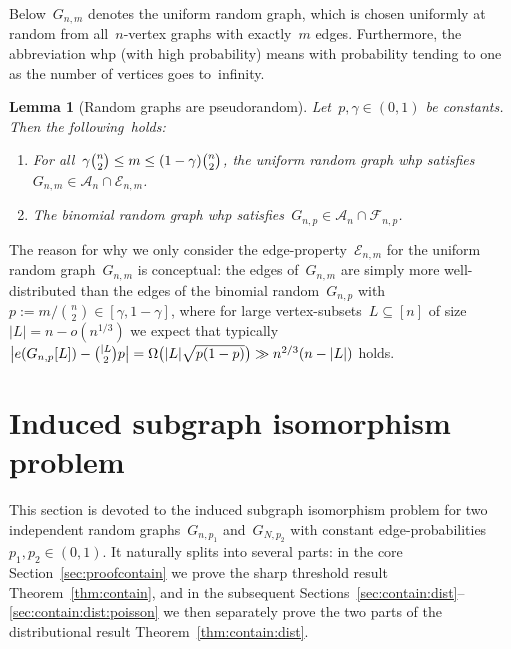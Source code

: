 \documentclass{article}
\newcommand{\cA}{\mathcal{A}}
\newcommand{\cE}{\mathcal{E}}
\newcommand{\cF}{\mathcal{F}}
\newtheorem{lemma}[thm]{Lemma}
\newcommand\bigpar[1]{\bigl(#1\bigr)}
\newcommand{\refT}[1]{Theorem~\ref{#1}}
\newcommand{\refS}[1]{Section~\ref{#1}}
\newenvironment{romenumerate}{\vspace{-0.25em}\begin{enumerate}\itemsep0pt \parskip0pt \parsep0pt\renewcommand{\labelenumi}{\textup{(\roman{enumi})}}\renewcommand{\theenumi}{\textup{(\roman{enumi})}}}{\vspace{-0.05em}\end{enumerate}\vspace{-0.05em}}
\begin{document}
Below~$G_{n,m}$ denotes the uniform random graph, which is chosen uniformly at random from all~$n$-vertex graphs with exactly~$m$ edges. 
Furthermore, the abbreviation whp (with high probability) means with probability tending to one as the number of vertices goes to~infinity. 
\begin{lemma}[Random graphs are pseudorandom]\label{lem:typical}
Let~$p,\gamma \in (0,1)$ be constants. Then the following~holds:
\begin{romenumerate}
\item For all~$\gamma \tbinom{n}{2} \le m \le (1-\gamma)\tbinom{n}{2}$, the uniform random graph whp satisfies~$G_{n,m} \in \cA_n \cap \cE_{n,m}$.
\item The binomial random graph whp satisfies~$G_{n,p} \in \cA_n \cap \cF_{n,p}$.
\end{romenumerate}\vspace{-0.125em}\end{lemma}
The reason for why we only consider the edge-property~$\cE_{n,m}$ for the uniform random graph~$G_{n,m}$ is conceptual: the edges of~$G_{n,m}$ are simply more well-distributed than the edges of the binomial random~$G_{n,p}$ with~$p:=m/\binom{n}{2} \in [\gamma,1-\gamma]$, where for large vertex-subsets~$L \subseteq [n]$ of size~$|L|= n - o(n^{1/3})$ we expect that typically $\bigl|e(G_{n,p}[L])-\tbinom{|L}{2}p\bigr| = \Omega\bigpar{|L|\sqrt{p(1-p)}} \gg n^{2/3}(n-|L|)$ holds.








\pagebreak[3]
\section{Induced subgraph isomorphism problem}\label{sec:contain}
This section is devoted to the induced subgraph isomorphism problem for two independent random graphs~$G_{n, p_1}$ and~$G_{N,p_2}$ with constant edge-probabilities~${p_1,p_2 \in (0,1)}$. 
It naturally splits into several parts: in the core \refS{sec:proofcontain} we prove the sharp threshold result \refT{thm:contain}, and in the subsequent Sections~\ref{sec:contain:dist}--\ref{sec:contain:dist:poisson} we then separately prove the two parts of the distributional result \refT{thm:contain:dist}. 



    
\end{document}
